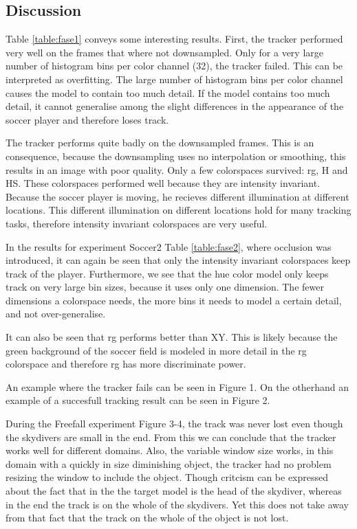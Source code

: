 \documentclass[a4paper,11pt]{article}
\begin{document}
\subsection{Discussion}
Table \ref{table:fase1} conveys some interesting results. First, the tracker performed very well on the frames that where not
downsampled. Only for a very large number of histogram bins per color channel (32), the tracker failed. This can be
interpreted as overfitting. The large number of histogram bins per color channel causes the model to
contain too much detail. If the model contains too much detail, it cannot
generalise among the slight differences in the appearance  of the soccer player and therefore loses track.

The tracker performs quite badly on the downsampled frames. This is an  consequence, because  the downsampling uses no interpolation or smoothing, this results in an image with poor quality. Only a few colorspaces
survived: rg, H and HS. These colorspaces performed well because they are
intensity invariant. Because the soccer player is moving, he recieves different
illumination at different locations. This different illumination on different
locations hold for many tracking tasks, therefore intensity
invariant colorspaces are very useful.

In the results for experiment Soccer2 Table \ref{table:fase2}, where occlusion was introduced, it can again be seen  that only the intensity
invariant colorspaces keep track of the player. Furthermore, we see that the hue
color model only keeps track on very large bin sizes, because it uses
only one dimension. The fewer dimensions a colorspace needs, the more bins it
needs to model a certain detail, and not over-generalise.

It can also be seen that rg performs better than XY. This is likely because the green
background of the soccer field is modeled in more detail in the rg colorspace and
therefore rg has more discriminate power.

An example where the tracker fails can be seen in Figure 1. On the
otherhand an example of a succesfull tracking result can be seen in
Figure 2.

During the Freefall experiment Figure 3-4, the track was never lost even though the skydivers are small in the end. From this we can conclude that the tracker works well for different domains. Also, the variable window size works, in this domain with a quickly in size diminishing object, the tracker had no problem resizing the window to include the object. Though critcism can be expressed about the fact that in the the target model is the head of the skydiver, whereas in the end the track is on the whole of the skydivers. Yet this does not take away from that fact that the track on the whole of the object is not lost.  
\end{document}
